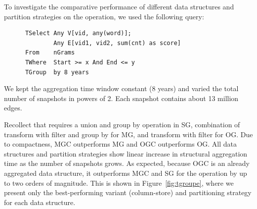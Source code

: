 To investigate the comparative performance of different data
structures and partition strategies on the  operation, we used
the following query:

\begin{small}
\begin{verbatim}
      TSelect Any V[vid, any(word)];
              Any E[vid1, vid2, sum(cnt) as score]
      From    nGrams
      TWhere  Start >= x And End <= y
      TGroup  by 8 years
\end{verbatim}
\end{small}

We kept the aggregation time window constant (8 years) and varied the
total number of snapshots in powers of 2.  Each snapshot contains
about 13 million edges.

Recollect that  requires a union and group by operation
in SG, combination of transform with filter and group by for MG, and
transform with filter for OG.  Due to compactness, MGC outperforms MG
and OGC outperforms OG.  All data structures and partition strategies
show linear increase in structural aggregation time as the number of
snapshots grows.  As expected, because OGC is an already aggregated
data structure, it outperforms MGC and SG for the 
operation by up to two orders of magnitude.  This is shown in
Figure~\ref{fig:tgroupe}, where we present only the best-performing
variant (column-store) and partitioning strategy for each data
structure.

